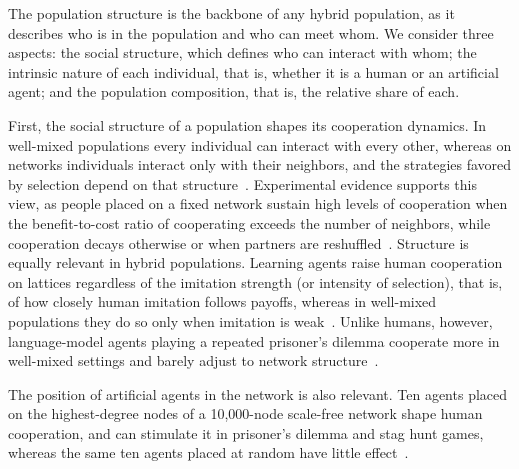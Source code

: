 
The population structure is the backbone of any hybrid population, as it describes who is in the population and who can meet whom. We consider three aspects: the social structure, which defines who can interact with whom; the intrinsic nature of each individual, that is, whether it is a human or an artificial agent; and the population composition, that is, the relative share of each.


First, the social structure of a population shapes its cooperation dynamics. In well-mixed populations every individual can interact with every other, whereas on networks individuals interact only with their neighbors, and the strategies favored by selection depend on that structure~\cite{allenEvolutionaryDynamicsAny2017}. Experimental evidence supports this view, as people placed on a fixed network sustain high levels of cooperation when the benefit-to-cost ratio of cooperating exceeds the number of neighbors, while cooperation decays otherwise or when partners are reshuffled~\cite{randStaticNetworkStructure2014}. Structure is equally relevant in hybrid populations. Learning agents raise human cooperation on lattices regardless of the imitation strength (or intensity of selection), that is, of how closely human imitation follows payoffs, whereas in well-mixed populations they do so only when imitation is weak~\cite{guoEngineeringOptimalCooperation2024}. Unlike humans, however, language-model agents playing a repeated prisoner's dilemma cooperate more in well-mixed settings and barely adjust to network structure~\cite{hanStaticNetworkStructure2025}.

The position of artificial agents in the network is also relevant. Ten agents placed on the highest-degree nodes of a 10,000-node scale-free network shape human cooperation, and can stimulate it in prisoner's dilemma and stag hunt games, whereas the same ten agents placed at random have little effect~\cite{guoFacilitatingCooperationHumanagent2023}.


